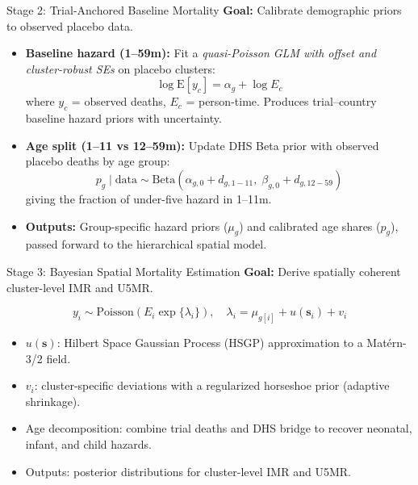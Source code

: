 \documentclass[aspectratio=169]{beamer}\usepackage[]{graphicx}\usepackage[dvipsnames]{xcolor}
\begin{document}
\begin{frame}{Stage 2: Trial-Anchored Baseline Mortality}
\textbf{Goal:} Calibrate demographic priors to observed placebo data.

\begin{itemize}
  \item \textbf{Baseline hazard (1--59m):}  
        Fit a \emph{quasi-Poisson GLM with offset and cluster-robust SEs} on placebo clusters:  
        \[
        \log \mathrm{E}[y_c] = \alpha_g + \log E_c
        \]
        where $y_c$ = observed deaths, $E_c$ = person-time.  
        Produces trial--country baseline hazard priors with uncertainty.

  \item \textbf{Age split (1--11 vs 12--59m):}  
        Update DHS Beta prior with observed placebo deaths by age group:  
        \[
        p_g \mid \text{data} \sim \text{Beta}(\alpha_{g,0} + d_{g,1-11},\;\beta_{g,0} + d_{g,12-59})
        \]
        giving the fraction of under-five hazard in 1--11m.

  \item \textbf{Outputs:} Group-specific hazard priors ($\mu_g$) and calibrated age shares ($p_g$), passed forward to the hierarchical spatial model.
\end{itemize}
\end{frame}


\begin{frame}{Stage 3: Bayesian Spatial Mortality Estimation}
\textbf{Goal:} Derive spatially coherent cluster-level IMR and U5MR.

\[
y_i \sim \text{Poisson}(E_i \exp\{\lambda_i\}), \quad
\lambda_i = \mu_{g[i]} + u(\mathbf{s}_i) + v_i
\]

\begin{itemize}
  \item $u(\mathbf{s})$: Hilbert Space Gaussian Process (HSGP) approximation to a Matérn-3/2 field.
  \item $v_i$: cluster-specific deviations with a regularized horseshoe prior (adaptive shrinkage).
  \item Age decomposition: combine trial deaths and DHS bridge to recover neonatal, infant, and child hazards.
  \item Outputs: posterior distributions for cluster-level IMR and U5MR.
\end{itemize}
\end{frame}
\end{document}
